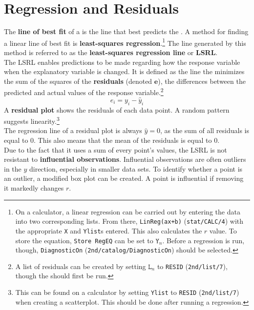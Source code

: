 \documentclass[../AP_Statistics.tex]{subfiles}
\begin{document}
		\section{Regression and Residuals}
			The \textbf{line of best fit} of a  is the line that best predicts the . A method for finding a linear line of best fit is \textbf{least-squares regression}.\footnote{On a calculator, a linear regression can be carried out by entering the data into two corresponding lists. From there, \texttt{LinReg(ax+b)} (\texttt{stat/CALC/4}) with the appropriate \texttt{X} and \texttt{Ylist}s entered. This also calculates the $r$ value. To store the equation, \texttt{Store RegEQ} can be set to $\texttt{Y}_n$. Before a regression is run, though, \texttt{DiagnosticOn} (\texttt{2nd/catalog/DiagnosticOn}) should be selected.} The line generated by this method is referred to as the \textbf{least-squares regression line} or \textbf{LSRL}. \\
			The LSRL enables predictions to be made regarding how the response variable when the explanatory variable is changed. It is defined as the line the minimizes the sum of the squares of the \textbf{residuals} (denoted $\bm{e}$), the differences between the predicted and actual values of the response variable.\footnote{A list of residuals can be created by setting $\texttt{L}_n$ to \texttt{RESID} (\texttt{2nd/list/7}), though the  should first be run.}
			\[e_i = y_i - \hat{y}_i\]
			A \textbf{residual plot} shows the residuals of each data point. A random pattern suggests linearity.\footnote{This can be found on a calculator by setting \texttt{Ylist} to \texttt{RESID} (\texttt{2nd/list/7}) when creating a scatterplot. This should be done after running a regression.} \\
			The regression line of a residual plot is always $\hat{y} = 0$, as the sum of all residuals is equal to 0. This also means that the mean of the residuals is equal to 0. \\
			Due to the fact that it uses a sum of every point's values, the LSRL is not resistant to \textbf{influential observations}. Influential observations are often outliers in the $y$ direction, especially in smaller data sets. To identify whether a point is an outlier, a modified box plot can be created. A point is influential if removing it markedly changes $r$. \\
\end{document}
